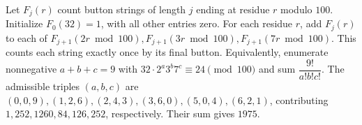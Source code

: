 Let $F_j(r)$ count button strings of length $j$ ending at residue $r$ modulo $100$. Initialize $F_0(32)=1$, with all other entries zero. For each residue $r$, add $F_j(r)$ to each of $F_{j+1}(2r\bmod100),F_{j+1}(3r\bmod100),F_{j+1}(7r\bmod100)$. This counts each string exactly once by its final button. Equivalently, enumerate nonnegative $a+b+c=9$ with $32\cdot2^a3^b7^c\equiv24\pmod{100}$ and sum $\dfrac{9!}{a!b!c!}$. The admissible triples $(a,b,c)$ are $(0,0,9),(1,2,6),(2,4,3),(3,6,0),(5,0,4),(6,2,1)$, contributing $1,252,1260,84,126,252$, respectively. Their sum gives $\boxed{1975}$.
